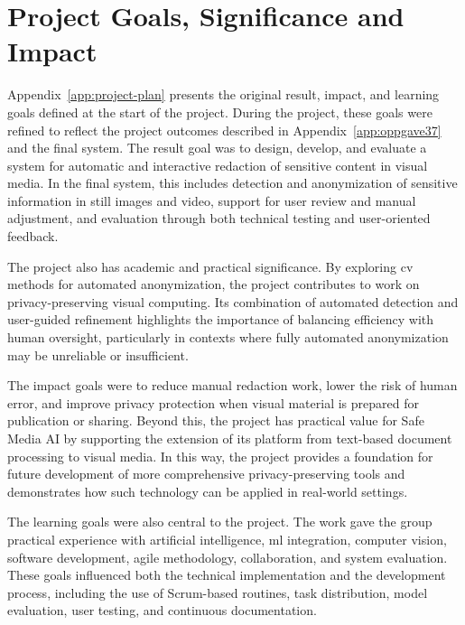 
\section{Project Goals, Significance and Impact}
\label{sec:goals}

Appendix~\ref{app:project-plan} presents the original result, impact, and learning goals defined at the start of the project. During the project, these goals were refined to reflect the project outcomes described in Appendix~\ref{app:oppgave37} and the final system. The result goal was to design, develop, and evaluate a system for automatic and interactive redaction of sensitive content in visual media. In the final system, this includes detection and \gls{anonymization} of sensitive information in still images and video, support for user review and manual adjustment, and evaluation through both technical testing and user-oriented feedback.

The project also has academic and practical significance. By exploring \acrshort{cv} methods for automated \gls{anonymization}, the project contributes to work on privacy-preserving visual computing. Its combination of automated detection and user-guided refinement highlights the importance of balancing efficiency with human oversight, particularly in contexts where fully automated \gls{anonymization} may be unreliable or insufficient.

The impact goals were to reduce manual redaction work, lower the risk of human error, and improve privacy protection when visual material is prepared for publication or sharing. Beyond this, the project has practical value for Safe Media AI by supporting the extension of its platform from text-based document processing to visual media. In this way, the project provides a foundation for future development of more comprehensive privacy-preserving tools and demonstrates how such technology can be applied in real-world settings.

The learning goals were also central to the project. The work gave the group practical experience with artificial intelligence, \acrshort{ml} integration, computer vision, software development, agile methodology, collaboration, and system evaluation. These goals influenced both the technical implementation and the development process, including the use of Scrum-based routines, task distribution, model evaluation, user testing, and continuous documentation.

